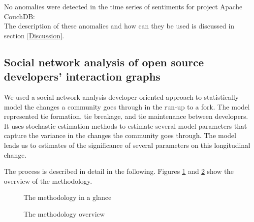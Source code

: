 \documentclass[12pt]{report}
\begin{document}
%
%

No anomalies were detected in the time series of sentiments for project Apache CouchDB: \\

The description of these anomalies and how can they be used is discussed in section \ref{Discussion}.

\pagebreak

\subsection{Social network analysis of open source developers’ interaction graphs}

We used a social network analysis developer-oriented approach to statistically model the changes a community goes through in the run-up to a fork. The model represented tie formation, tie breakage, and tie maintenance between developers. It uses stochastic estimation methods to estimate several model parameters that capture the variance in the changes the community goes through. The model leads us to estimates of the significance of several parameters on this longitudinal change.

The process is described in detail in the following. Figures \ref{FlowChart} and \ref{FlowChartOverview} show the overview of the methodology.

\begin{figure}[!ht]
\centering
{}
\caption{The methodology in a glance}
\label{FlowChart}
\end{figure}

\begin{figure}[!ht]
\centering
{}
\caption{The methodology overview}
\label{FlowChartOverview}
\end{figure}
\end{document}
